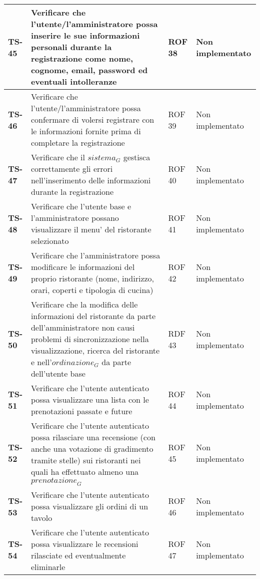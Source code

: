 \begin{longtable}{|>{\centering\arraybackslash}p{1.5cm}|p{9.8cm}|p{2cm}|p{3.5cm}|}
    \hline
    \rowcolor{gray!10}
    \textbf{TS-45} & Verificare che l'utente/l'amministratore possa inserire le sue informazioni personali durante la registrazione come nome, cognome, email, password ed eventuali intolleranze & ROF 38 & Non implementato \\
    \hline
    \rowcolor{gray!10}
    \textbf{TS-46} & Verificare che l'utente/l'amministratore possa confermare di volersi registrare con le informazioni fornite prima di completare la registrazione & ROF 39 & Non implementato \\ 
    \hline
    \rowcolor{gray!10}
    \textbf{TS-47} & Verificare che il $\textit{sistema}_G$ gestisca correttamente gli errori nell'inserimento delle informazioni durante la registrazione & ROF 40 & Non implementato \\ 
    \hline
    \rowcolor{gray!10}
    \textbf{TS-48} & Verificare che l'utente base e l'amministratore possano visualizzare il menu' del ristorante selezionato & ROF 41 & Non implementato \\ 
    \hline
    \rowcolor{gray!10}
    \textbf{TS-49} & Verificare che l'amministratore possa modificare le informazioni del proprio ristorante (nome, indirizzo, orari, coperti e tipologia di cucina) & ROF 42 & Non implementato \\
    \hline
    \rowcolor{gray!10}
    \textbf{TS-50} & Verificare che la modifica delle informazioni del ristorante da parte dell'amministratore non causi problemi di sincronizzazione nella visualizzazione, ricerca del ristorante e nell'$\textit{ordinazione}_G$ da parte dell'utente base & RDF 43 & Non implementato \\ 
    \hline
    \rowcolor{gray!10}
    \textbf{TS-51} & Verificare che l'utente autenticato possa visualizzare una lista con le prenotazioni passate e future & ROF 44 & Non implementato \\ 
    \hline
    \rowcolor{gray!10}
    \textbf{TS-52} & Verificare che l'utente autenticato possa rilasciare una recensione (con anche una votazione di gradimento tramite stelle) sui ristoranti nei quali ha effettuato almeno una $\textit{prenotazione}_G$ & ROF 45 & Non implementato \\ 
    \hline
    \rowcolor{gray!10}
    \textbf{TS-53} & Verificare che l'utente autenticato possa visualizzare gli ordini di un tavolo & ROF 46 & Non implementato \\ 
    \hline
    \rowcolor{gray!10}
    \textbf{TS-54} & Verificare che l'utente autenticato possa visualizzare le recensioni rilasciate ed eventualmente eliminarle & ROF 47 & Non implementato \\ 

\end{longtable}
